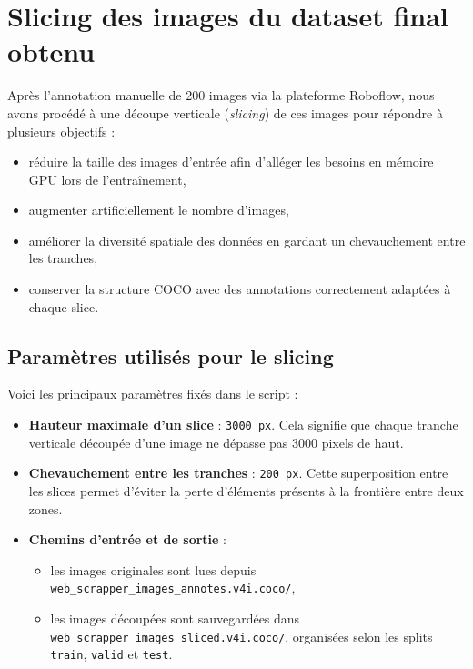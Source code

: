 \documentclass[12pt,a4paper]{report}
\begin{document}
\section{Slicing des images du dataset final obtenu}

Après l’annotation manuelle de 200 images via la plateforme Roboflow, nous avons procédé à une découpe verticale (\textit{slicing}) de ces images pour répondre à plusieurs objectifs :
\begin{itemize}
  \item réduire la taille des images d’entrée afin d’alléger les besoins en mémoire GPU lors de l’entraînement,
  \item augmenter artificiellement le nombre d’images,
  \item améliorer la diversité spatiale des données en gardant un chevauchement entre les tranches,
  \item conserver la structure COCO avec des annotations correctement adaptées à chaque slice.
\end{itemize}

\subsection{Paramètres utilisés pour le slicing}

Voici les principaux paramètres fixés dans le script :

\begin{itemize}
  \item \textbf{Hauteur maximale d’un slice} : \texttt{3000~px}. Cela signifie que chaque tranche verticale découpée d’une image ne dépasse pas 3000 pixels de haut.
  \item \textbf{Chevauchement entre les tranches} : \texttt{200~px}. Cette superposition entre les slices permet d’éviter la perte d’éléments présents à la frontière entre deux zones.
  \item \textbf{Chemins d’entrée et de sortie} :
    \begin{itemize}
      \item les images originales sont lues depuis \texttt{web\_scrapper\_images\_annotes.v4i.coco/},
      \item les images découpées sont sauvegardées dans \texttt{web\_scrapper\_images\_sliced.v4i.coco/}, organisées selon les splits \texttt{train}, \texttt{valid} et \texttt{test}.
    \end{itemize}
\end{itemize}
\end{document}
